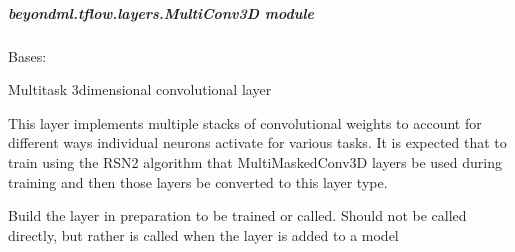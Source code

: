 \documentclass[letterpaper,10pt,english]{sphinxmanual}
\begin{document}
\subparagraph{beyondml.tflow.layers.MultiConv3D module}
\label{\detokenize{beyondml.tflow.layers:module-beyondml.tflow.layers.MultiConv3D}}\label{\detokenize{beyondml.tflow.layers:beyondml-tflow-layers-multiconv3d-module}}

\begin{fulllineitems}
\label{\detokenize{beyondml.tflow.layers:beyondml.tflow.layers.MultiConv3D.MultiConv3D}}
\pysigstartsignatures
{}
\pysigstopsignatures
\sphinxAtStartPar
Bases: 

\sphinxAtStartPar
Multitask 3\sphinxhyphen{}dimensional convolutional layer

\sphinxAtStartPar
This layer implements multiple stacks of convolutional weights to account for different ways individual
neurons activate for various tasks. It is expected that to train using the RSN2 algorithm that MultiMaskedConv3D
layers be used during training and then those layers be converted to this layer type.

\begin{fulllineitems}
\label{\detokenize{beyondml.tflow.layers:beyondml.tflow.layers.MultiConv3D.MultiConv3D.build}}
\pysigstartsignatures
{}
\pysigstopsignatures
\sphinxAtStartPar
Build the layer in preparation to be trained or called. Should not be called directly,
but rather is called when the layer is added to a model

\end{fulllineitems}



\end{fulllineitems}
\end{document}
